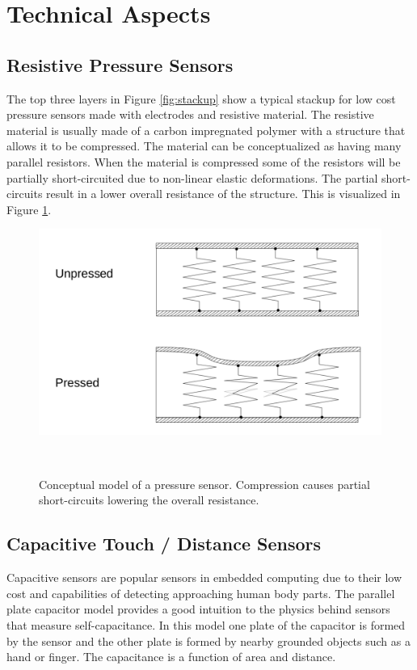 \documentclass{sigchi-ext}
\begin{document}
\section{Technical Aspects}
\subsection{Resistive Pressure Sensors}
The top three layers in Figure \ref{fig:stackup} show a typical stackup for 
low cost pressure sensors made with electrodes and resistive material. The
resistive material is usually made of a carbon impregnated polymer
with a structure that allows it to be compressed. The material
can be conceptualized as having many parallel resistors. When the material is
compressed some of the resistors will be partially short-circuited due to
non-linear elastic deformations. The partial short-circuits result in a lower
overall resistance of the structure. This is visualized
in Figure \ref{fig:pressure_sensor}.

\begin{figure}[h!]
\centering
\includegraphics[trim={0 1.4cm 0 1.7cm},clip,width=0.9\columnwidth]{figures/resistive_sensor}
 \caption{Conceptual model of a pressure sensor. Compression causes
  partial short-circuits lowering the overall resistance.}~\label{fig:pressure_sensor}
\end{figure}



\subsection{Capacitive Touch / Distance Sensors}
Capacitive sensors are popular sensors in embedded computing due to their low cost
and capabilities of detecting approaching human body parts.
The parallel plate capacitor model provides a good intuition to the
physics behind sensors that measure self-capacitance. In this model one plate of
the capacitor is formed by the sensor and the other plate is formed by
nearby grounded objects such as a hand or finger. The capacitance is a function of area
and distance.
\end{document}
